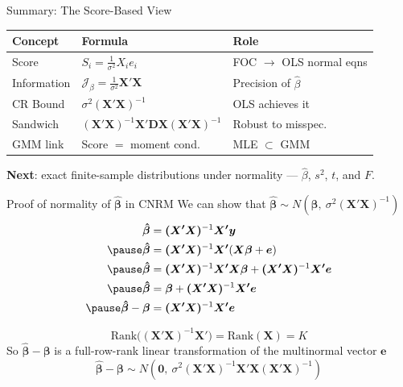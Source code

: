 \documentclass[aspectratio=169, handout, t]{beamer}
\numberwithin{equation}{section}
\begin{document}
\begin{frame}{Summary: The Score-Based View}
\begin{center}
\begin{tabular}{lll}
\toprule
\textbf{Concept} & \textbf{Formula} & \textbf{Role}\\
\midrule
Score & $S_i=\frac{1}{\sigma^2}X_i e_i$ & FOC $\to$ OLS normal eqns\\\pause
Information & $\mathcal{J}_\beta=\frac{1}{\sigma^2}\bm{X'X}$ & Precision of $\hat{\beta}$\\\pause
CR Bound & $\sigma^2(\bm{X'X})^{-1}$ & OLS achieves it\\\pause
Sandwich & $(\bm{X'X})^{-1}\bm{X'DX}(\bm{X'X})^{-1}$ & Robust to misspec.\\\pause
GMM link & Score $=$ moment cond. & MLE $\subset$ GMM\\
\bottomrule
\end{tabular}
\end{center}\pause
\medskip
\textbf{Next}: exact finite-sample distributions under normality --- $\hat{\beta}$, $s^2$, $t$, and $F$.
\end{frame}

\begin{frame}{Proof of normality of $\bm{\hat{\beta}}$ in CNRM}
We can show that $\bm{\hat{\beta}}\sim N(\bm{\beta},\ \sigma^2\bm{(X'X)}^{-1})$
\begin{align*}
\bm{\hat{\beta}}&=\bm{(X'X)}^{-1}\bm{X'}\bm{y}\\\pause
\bm{\hat{\beta}}&=\bm{(X'X)}^{-1}\bm{X'}(\bm{X}\bm{\beta}+\bm{e})\\\pause
\bm{\hat{\beta}}&=\bm{(X'X)}^{-1}\bm{X'}\bm{X}\bm{\beta}+\bm{(X'X)}^{-1}\bm{X'}\bm{e}\\\pause
\bm{\hat{\beta}}&=\bm{\beta}+\bm{(X'X)}^{-1}\bm{X'}\bm{e}\\\pause
\bm{\hat{\beta}}-\bm{\beta}&=\bm{(X'X)}^{-1}\bm{X'}\bm{e}
\end{align*}

$$\text{Rank}\bm{((X'X)}^{-1}\bm{X'})=\text{Rank}(\bm{X})=K$$
So $\bm{\hat{\beta}}-\bm{\beta}$ is a full-row-rank linear transformation of the multinormal vector $\bm{e}$
$$\bm{\hat{\beta}}-\bm{\beta} \sim N(\bm{0},\ \sigma^2\bm{(X'X)}^{-1}\bm{X'}\bm{X}\bm{(X'X)}^{-1})$$
\end{frame}
\end{document}
